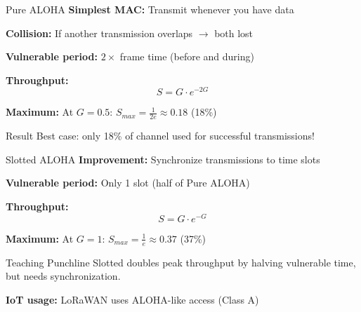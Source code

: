 \documentclass[aspectratio=169,11pt]{beamer}
\begin{document}
\begin{frame}{Pure ALOHA}
    \textbf{Simplest MAC:} Transmit whenever you have data
    
    \vspace{0.3cm}
    \textbf{Collision:} If another transmission overlaps $\rightarrow$ both lost
    
    \textbf{Vulnerable period:} $2 \times$ frame time (before and during)
    
    \vspace{0.3cm}
    \textbf{Throughput:}
    \[
    S = G \cdot e^{-2G}
    \]
    
    \textbf{Maximum:} At $G = 0.5$: $S_{max} = \frac{1}{2e} \approx \mathbf{0.18}$ (18\%)
    
    \begin{alertblock}{Result}
        Best case: only 18\% of channel used for successful transmissions!
    \end{alertblock}
\end{frame}

\begin{frame}{Slotted ALOHA}
    \textbf{Improvement:} Synchronize transmissions to time slots
    
    \vspace{0.3cm}
    \textbf{Vulnerable period:} Only 1 slot (half of Pure ALOHA)
    
    \vspace{0.3cm}
    \textbf{Throughput:}
    \[
    S = G \cdot e^{-G}
    \]
    
    \textbf{Maximum:} At $G = 1$: $S_{max} = \frac{1}{e} \approx \mathbf{0.37}$ (37\%)
    
    \begin{block}{Teaching Punchline}
        Slotted doubles peak throughput by halving vulnerable time, but needs synchronization.
    \end{block}
    
    \textbf{IoT usage:} LoRaWAN uses ALOHA-like access (Class A)
\end{frame}
\end{document}
